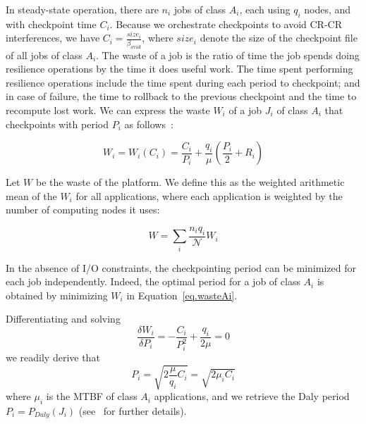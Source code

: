 \documentclass[two]{article}
\newcommand{\bandavail}{\beta_{\text{avail}}}
\newcommand{\nbnodesplat}{{\mathcal N}}
\newcommand{\app}[1]{A_{#1}}
\newcommand{\nbapp}[1]{n_{#1}}
\newcommand{\nbnodes}[1]{q_{#1}}
\newcommand{\period}[1]{P_{#1}}
\newcommand{\ckpt}[1]{C_{#1}}
\newcommand{\reco}[1]{R_{#1}}
\newcommand{\size}[1]{\mathit{size}_{#1}}
\newcommand{\wasteapp}[1]{W_{#1}}
\newcommand{\mtbfplat}{\mu}
\newcommand{\wasteplat}{W}
\newcommand{\wastefct}[2]{W_{#1}(#2)}
\begin{document}
In steady-state operation, there are $\nbapp{i}$ jobs of class $\app{i}$, each
using $\nbnodes{i}$ nodes, and with checkpoint time $\ckpt{i}$. Because we
orchestrate checkpoints to avoid CR-CR interferences, we have $\ckpt{i} =
\frac{\size{i}}{\bandavail}$, where $\size{i}$ denote the size of the
checkpoint file of all jobs of class $\app{i}$.  The waste of a job is the
ratio of time the job spends doing resilience operations by the time it does
useful work. The time spent performing resilience operations include the time spent
during each period to checkpoint; and in case of failure, the time to rollback
to the previous checkpoint and the time to recompute lost work.
We can express the waste $\wasteapp{i}$ of a job $J_{i}$ of class $\app{i}$
that checkpoints with period $\period{i}$ as follows~\cite{springer-monograph}:

\begin{equation}
\wasteapp{i} = \wastefct{i}{\ckpt{i}} = \frac{\ckpt{i}}{\period{i}} +
\frac{\nbnodes{i}}{\mtbfplat}(\frac{\period{i}}{2} + \reco{i})
\label{eq.wasteAi}
\end{equation}

Let $\wasteplat$ be the waste of the platform. We define this as the
weighted arithmetic mean of the $\wasteapp{i}$ for all applications,
where each application is weighted by the number of computing nodes
it uses:

\begin{equation}
\wasteplat = \sum_i \frac{\nbapp{i} \nbnodes{i}}{\nbnodesplat} \wasteapp{i}
\label{eq.waste}
\end{equation}

In the absence of I/O constraints, the checkpointing period can be minimized
for each job independently. Indeed, the optimal period for a job
of class $\app{i}$ is obtained by minimizing $\wasteapp{i}$ in 
Equation~\eqref{eq.wasteAi}.

Differentiating and solving
$$\frac{\delta \wasteapp{i}}{\delta \period{i}} = - \frac{\ckpt{i}}{\period{i}^{2}} + \frac{\nbnodes{i}}{2 \mtbfplat} = 0$$
we readily derive that
\begin{equation}
\period{i} = \sqrt{2 \frac{\mtbfplat}{\nbnodes{i}} \ckpt{i}} = \sqrt{2 \mu_{i} \ckpt{i}}
\label{eq.daly}
\end{equation}
where $\mu_{i}$ is the MTBF of  class $\app{i}$ applications, and we retrieve the Daly period
$\period{i} = \period{Daly}(J_{i})$ (see~\cite{springer-monograph} for further details).
\end{document}
